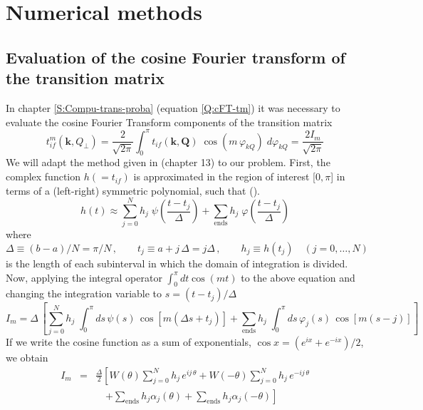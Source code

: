 \chapter{Numerical methods}

\section{Evaluation of the cosine Fourier transform of the transition matrix}

In chapter \ref{S:Compu-trans-proba} (equation \ref{Q:cFT-tm}) it was necessary to
evaluate the cosine Fourier Transform components of the transition matrix
\[
t^{m}_{if}(\bm{k},Q_{\perp})= \frac{2}{\sqrt{2 \pi}} \int_{0}^{\pi} t_{if}(\bm{k},\bm{Q})
\; \cos{(m \, \varphi_{k Q})} \; d \varphi_{k Q} = \frac{2 I_{m}}{\sqrt{2 \pi}}
\]
We will adapt the method given in \cite{Press1966_NRIvI} (chapter 13) to our
problem. First, the complex function $h (= t_{if})$ is approximated in the region of
interest [$0,\pi$] in terms of a (left-right) symmetric polynomial, such that
(\cite[(13.9.7)]{Press1966_NRIvI}).
\begin{equation}\label{Q:NMI0}
  h(t) \approx \sum_{j=0}^{N} h_{j} \; \psi\left( \frac{t-t_{j}}{\Delta}
  \right) + \sum_{\mathrm{ends}} h_{j} \; \varphi \left(
    \frac{t-t_{j}}{\Delta} \right)
\end{equation}
where
\[
\Delta \equiv (b-a)/N = \pi/N \, , \qquad t_{j}\equiv a+j\,\Delta = j \Delta \,, \qquad
h_{j} \equiv h(t_{j}) \quad (j=0,\ldots,N)
\]
is the length of each subinterval in which the domain of integration is divided. Now,
applying the integral operator $\int_{0}^{\pi} d t \cos{(mt)}$ to the above equation and
changing the integration variable to $s=\left( t-t_{j} \right)/\Delta$
\[
I_{m} = \Delta \, \left[ \sum_{j=0}^{N} h_{j} \; \int_{0}^{\pi} d s \, \psi(s) \,
  \cos{\left[ m (\Delta s + t_{j}) \right]} + \sum_{\mathrm{ends}} h_{j} \; \int_{0}^{\pi}
  d s \, \varphi_{j}(s) \, \cos{\left[ m ( s - j) \right]} \right]
\]
If we write the cosine function as a sum of exponentials, $\cos{x} = \left( e^{i x} +
  e^{-i x} \right)/2$, we obtain
\begin{eqnarray*}
  I_{m} &=& \frac{\Delta}{2} \left[W(\theta) \sum_{j=0}^{N} h_{j} \,
    e^{i j \, \theta} + W(-\theta) \sum_{j=0}^{N} h_{j} \,
    e^{-i j \,\theta} \right.
  \\
  && \quad \left. + \sum_{\mathrm{ends}} h_{j} \alpha_{j}(\theta) +
    \sum_{\mathrm{ends}} h_{j} \alpha_{j}(-\theta) \right] \nonumber
\end{eqnarray*}
